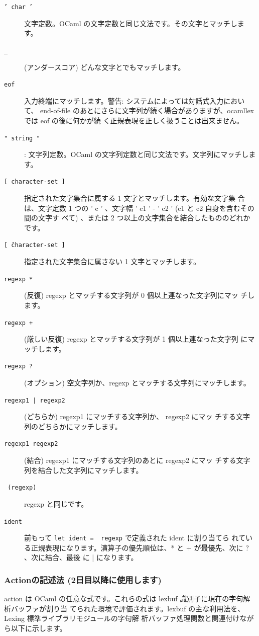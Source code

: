 \documentclass[a4paper,11pt]{jsarticle}
\begin{document}
\begin{description}
\item [\texttt{' char '}] 文字定数。OCaml の文字定数と同じ文法です。その文字とマッチします。
\item [\texttt{\_}] (アンダースコア) どんな文字とでもマッチします。
\item [\texttt{eof}] 入力終端にマッチします。警告: システムによっては対話式入力において、
  end-of-file のあとにさらに文字列が続く場合がありますが、ocamllex では eof の後に何かが続
  く正規表現を正しく扱うことは出来ません。
\item [\texttt{" string "}]: 文字列定数。OCaml の文字列定数と同じ文法です。文字列にマッチします。
\item [\texttt{[ character-set ]}] 指定された文字集合に属する 1 文字とマッチします。有効な文字集
  合は、文字定数 1 つの ' c ' 、文字幅 ' c1 ' - '  c2 ' (c1 と c2 自身を含むその間の文字す
  べて) 、または 2 つ以上の文字集合を結合したもののどれかです。
\item [\texttt{[ \^ character-set ]}] 指定された文字集合に属さない 1 文字とマッチします。
\item [\texttt{regexp *}] (反復) regexp とマッチする文字列が 0 個以上連なった文字列にマッ
  チします。
\item [\texttt{regexp +}] (厳しい反復) regexp とマッチする文字列が 1 個以上連なった文字列
  にマッチします。
\item [\texttt{regexp ?}] (オプション) 空文字列か、regexp とマッチする文字列にマッチします。
\item [\texttt{regexp1 | regexp2}] (どちらか) regexp1 にマッチする文字列か、 regexp2 にマッ
  チする文字列のどちらかにマッチします。
\item [\texttt{regexp1 regexp2}] (結合) regexp1 にマッチする文字列のあとに regexp2 にマッ
  チする文字列を結合した文字列にマッチします。
\item [\texttt{ (regexp) }] regexp と同じです。
\item [\texttt{ident}] 前もって \verb|let ident =  regexp| で定義された ident に割り当てら
  れている正規表現になります。演算子の優先順位は、* と + が最優先、次に ? 、次に結合、最後
  に | になります。
\end{description}

\subsubsection{Actionの記述法 (2日目以降に使用します)}

action は OCaml の任意な式です。これらの式は lexbuf 識別子に現在の字句解析バッファが割り当
てられた環境で評価されます。lexbuf の主な利用法を、Lexing 標準ライブラリモジュールの字句解
析バッファ処理関数と関連付けながら以下に示します。
\end{document}

